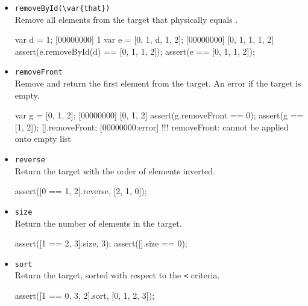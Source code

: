 \begin{itemize}
\begin{urbiscript}[firstnumber=last]
var t = [0, 1, 2];
[00000000] [0, 1, 2]
assert(t.removeBack == 2);
assert(t == [0, 1]);
[].removeBack;
[00000000:error] !!! removeBack: cannot be applied onto empty list
\end{urbiscript}

\item \lstinline|removeById(\var{that})|\\
Remove all elements from the target that physically equals .

\begin{urbiscript}[firstnumber=last]
var d = 1;
[00000000] 1
var e = [0, 1, d, 1, 2];
[00000000] [0, 1, 1, 1, 2]
assert(e.removeById(d) == [0, 1, 1, 2]);
assert(e == [0, 1, 1, 2]);
\end{urbiscript}

\item \lstinline|removeFront|\\
Remove and return the first element from the target. An error if the
target is empty.

\begin{urbiscript}[firstnumber=last]
var g = [0, 1, 2];
[00000000] [0, 1, 2]
assert(g.removeFront == 0);
assert(g == [1, 2]);
[].removeFront;
[00000000:error] !!! removeFront: cannot be applied onto empty list
\end{urbiscript}

\item \lstinline|reverse|\\
Return the target with the order of elements inverted.

\begin{urbiscript}[firstnumber=last]
assert([0 == 1, 2].reverse, [2, 1, 0]);
\end{urbiscript}

\item \lstinline|size|\\
Return the number of elements in the target.

\begin{urbiscript}[firstnumber=last]
assert([1 == 2, 3].size, 3);
assert([].size == 0);
\end{urbiscript}

\item \lstinline|sort|\\
Return the target, sorted with respect to the \lstinline|<| criteria.

\begin{urbiscript}[firstnumber=last]
assert([1 == 0, 3, 2].sort, [0, 1, 2, 3]);
\end{urbiscript}


\end{itemize}
